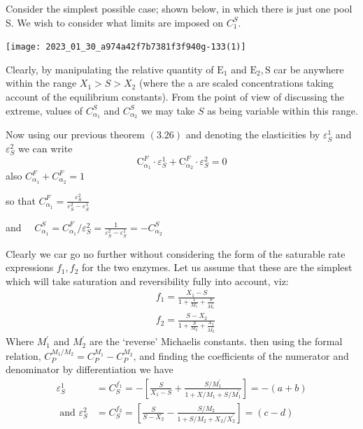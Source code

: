 Consider the simplest possible case; shown below, in which there is just one pool S. We wish to consider what limits are imposed on $C_{1}^{S}$.

\begin{center}
\texttt{[image: 2023\_01\_30\_a974a42f7b7381f3f940g-133(1)]}
\end{center}

Clearly, by manipulating the relative quantity of $\mathrm{E}_{1}$ and $\mathrm{E}_{2}, \mathrm{S}$ car be anywhere within the range $X_{1} > S>  X_{2}$ (where the a are scaled concentrations taking account of the equilibrium constants). From the point of view of discussing the extreme, values of $C_{\alpha_{1}}^{S}$ and $C_{\alpha_{2}}^{S}$ we may take $S$ as being variable within this range.

Now using our previous theorem $(3.26)$ and denoting the elasticities by $\varepsilon_{S}^{1}$ and $\varepsilon_{S}^{2}$ we can write
%
$$
\mathrm{C}_{\alpha_{1}}^{F} \cdot \varepsilon_{S}^{1}+\mathrm{C}_{\alpha_{2}}^{F} \cdot \varepsilon_{S}^{2} = 0
$$
%
also $C_{\alpha_{1}}^{F} + C_{\alpha_{2}}^{F}=1$

so that $C_{\alpha_{1}}^{F}=\frac{\varepsilon_{S}^{2}}{\varepsilon_{S}^{2}-\varepsilon_{S}^{1}}$

and $\quad C_{\alpha_{1}}^{S} = C_{\alpha_{1}}^{F} / \varepsilon_{S}^{2}=\frac{1}{\varepsilon_{S}^{2}-\varepsilon_{S}^{1}}=-C_{\alpha_{2}}^{S}$

Clearly we car go no further without considering the form of the saturable rate expressions $f_{1}, f_{2}$ for the two enzymes. Let us assume that these are the simplest which will take saturation and reversibility fully into account, viz:
%
$$
\begin{aligned}
& f_{1}=\frac{X_{1}-S}{1+\frac{1}{M_{1}}+\frac{S}{M_{1}^{\prime}}} \\[6pt]
& f_{2}=\frac{S-X_{2}}{1+\frac{S}{M_{2}}+\frac{X_{2}}{M_{2}^{\prime}}}
\end{aligned}
$$
%
Where $M_{1}^{\prime}$ and $M_{2}^{\prime}$ are the `reverse' Michaelis constants. then using the formal relation, $C_{P}^{M_{1} / M_{2}}=C_{P}^{M_{1}}-C_{P}^{M_{2}}$, and finding the coefficients of the numerator and denominator by differentiation we have
%
\begin{align*}
\varepsilon_{S}^{1} &= C_{S}^{f_1} = -\left[\frac{S}{X_{1}-S}+\frac{S / M_{1}^{\prime}}{1 + X/M_{1} + S/M_{1}^{\prime}}\right] = -(a+b) \\
%
\mbox{ and } \varepsilon_{S}^{2} &= C_{S}^{f_{2}} = \left[\frac{S}{S - X_{2}}-\frac{S/M_{2}}{1+ S/M_{2} + X_{2}/X_{2}^{\prime}}\right] = (c-d)
\end{align*}

